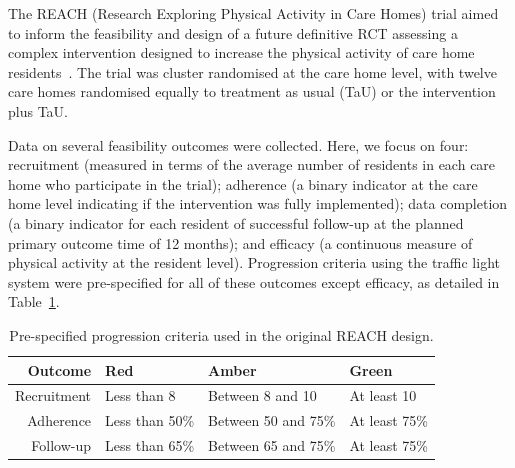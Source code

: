 \documentclass[AMA,STIX1COL]{WileyNJD-v2}
\begin{document}
The REACH (Research Exploring Physical Activity in Care Homes) trial aimed to inform the feasibility and design of a future definitive RCT assessing a complex intervention designed to increase the physical activity of care home residents~\cite{Forster2017}. The trial was cluster randomised at the care home level, with  twelve care homes randomised equally to treatment as usual (TaU) or the intervention plus TaU.

Data on several feasibility outcomes were collected. Here, we focus on four: recruitment (measured in terms of the average number of residents in each care home who participate in the trial); adherence (a binary indicator at the care home level indicating if the intervention was fully implemented); data completion (a binary indicator for each resident of successful follow-up at the planned primary outcome time of 12 months); and efficacy (a continuous measure of physical activity at the resident level). Progression criteria using the traffic light system were pre-specified for all of these outcomes except efficacy, as detailed in Table~\ref{tab:pcs}.

\begin{table}
\caption{Pre-specified progression criteria used in the original REACH design.}
\centering
\begin{tabular}{r l l l}
\toprule
Outcome & Red & Amber & Green \\
\midrule
Recruitment & Less than 8 & Between 8 and 10 & At least 10 \\
Adherence & Less than 50\% & Between 50 and 75\% & At least 75\% \\
Follow-up & Less than 65\% & Between 65 and 75\% & At least 75\% \\
\bottomrule
\end{tabular}
\label{tab:pcs}
\end{table}

\end{document}
